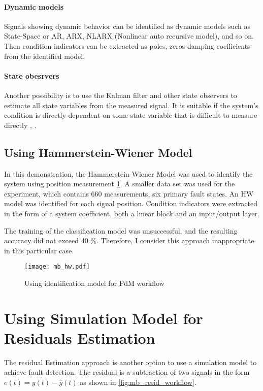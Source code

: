 \paragraph{Dynamic models}
Signals showing dynamic behavior can be identified as dynamic models such
as State-Space or AR, ARX, NLARX (Nonlinear auto recursive model), and so
on.  Then condition indicators can be extracted as poles, zeros damping
coefficients from the identified model.

\paragraph{State obesrvers}
Another possibility is to use the Kalman filter and other state observers
to estimate all state variables from the measured signal. It is suitable if
the system's condition is directly dependent on some state variable that is
difficult to measure directly \cite{matlab_full}, \cite{isermann_fdi}.

\subsection{Using Hammerstein-Wiener Model}\label{sec:mb_hw_demo}
In this demonstration, the Hammerstein-Wiener Model was used to identify
the system using position measurement \ref{fig:mb_hw_workflow}. A smaller
data set was used for the experiment, which contains 660 measurements, six
primary fault states. An HW model was identified for each signal position.
Condition indicators were extracted in the form of a system coefficient,
both a linear block and an input/output layer.

The training of the classification model was unsuccessful, and the
resulting accuracy did not exceed 40 \%. Therefore, I consider this
approach inappropriate in this particular case.

\begin{figure}[h!]
    \centering
    \texttt{[image: mb\_hw.pdf]}
    \caption{Using identification model for PdM workflow}
    \label{fig:mb_hw_workflow}
\end{figure}


\section{Using Simulation Model for Residuals Estimation}\label{sec:residuals}
The residual Estimation approach is another option to use a simulation
model to achieve fault detection.  The residual is a subtraction of two
signals in the form $e(t) = y(t) - \hat{y}(t)$ as shown in
\ref{fig:mb_resid_workflow}.

